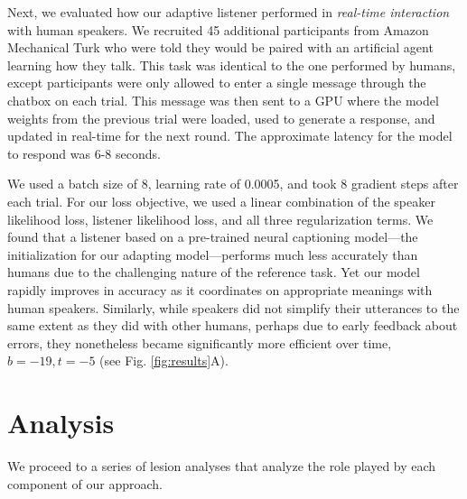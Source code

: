 Next, we evaluated how our adaptive listener performed in \emph{real-time interaction} with human speakers. 
We recruited 45 additional participants from Amazon Mechanical Turk who were told they would be paired with an artificial agent learning how they talk.
This task was identical to the one performed by humans, except participants were only allowed to enter a single message through the chatbox on each trial. 
This message was then sent to a GPU where the model weights from the previous trial were loaded, used to generate a response, and updated in real-time for the next round.
The approximate latency for the model to respond was 6-8 seconds.

We used a batch size of 8, learning rate of 0.0005, and took 8 gradient steps after each trial. 
For our loss objective, we used a linear combination of the speaker likelihood loss, listener likelihood loss, and all three regularization terms.
We found that a listener based on a pre-trained neural captioning model---the initialization for our adapting model---performs much less accurately than humans due to the challenging nature of the reference task. 
Yet our model rapidly improves in accuracy as it coordinates on appropriate meanings with human speakers.
Similarly, while speakers did not simplify their utterances to the same extent as they did with other humans, perhaps due to early feedback about errors, they nonetheless became significantly more efficient over time, $b = -19, t = -5$ (see Fig. \ref{fig:results}A).
\section{Analysis}

We proceed to a series of lesion analyses that analyze the role played by each component of our approach.

